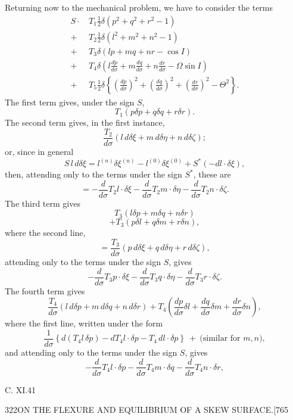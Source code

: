 \documentclass[11pt]{article}
\begin{document}
Returning now to the mechanical problem, we have to consider the terms
\begin{align*}
S\cdot\,& T_1\tfrac{1}{2}\delta(p^2 + q^2 + r^2 - 1) \\
+\,& T_2\tfrac{1}{2}\delta(l^2 + m^2 + n^2 - 1) \\
+\,& T_3\delta(lp + mq + nr - \cos I) \\
+\,& T_4\delta\left(l\frac{dp}{d\sigma} + m\frac{dq}{d\sigma} + n\frac{dr}{d\sigma} - \Omega\sin I\right) \\
+\,& T_5\tfrac{1}{2}\delta\left\{\left(\frac{dp}{d\sigma}\right)^2 + \left(\frac{dq}{d\sigma}\right)^2 + \left(\frac{dr}{d\sigma}\right)^2 - \Theta^2\right\}.
\end{align*}
The first term gives, under the sign $S$,
\[
T_1(p\delta p + q\delta q + r\delta r). \tag{*}
\]
The second term gives, in the first instance,
\[
\frac{T_2}{d\sigma}(l\,d\delta\xi + m\,d\delta\eta + n\,d\delta\zeta);
\]
or, since in general
\[
S\,l\,d\delta\xi = l^{(n)}\delta\xi^{(n)} - l^{(0)}\delta\xi^{(0)} + S^*(-dl\cdot\delta\xi),
\]
then, attending only to the terms under the sign $S^*$, these are
\[
= -\frac{d}{d\sigma}T_2 l\cdot\delta\xi - \frac{d}{d\sigma}T_2 m\cdot\delta\eta - \frac{d}{d\sigma}T_2 n\cdot\delta\zeta. \tag{*}
\]
The third term gives
\[
T_3(l\delta p + m\delta q + n\delta r) \tag{*}
\]
\[
+ T_3(p\delta l + q\delta m + r\delta n),
\]
where the second line,
\[
= \frac{T_3}{d\sigma}(p\,d\delta\xi + q\,d\delta\eta + r\,d\delta\zeta),
\]
attending only to the terms under the sign $S$, gives
\[
-\frac{d}{d\sigma}T_3 p\cdot\delta\xi - \frac{d}{d\sigma}T_3 q\cdot\delta\eta - \frac{d}{d\sigma}T_3 r\cdot\delta\zeta. \tag{*}
\]
The fourth term gives
\[
\frac{T_4}{d\sigma}\left(l\,d\delta p + m\,d\delta q + n\,d\delta r\right) + T_4\left(\frac{dp}{d\sigma}\delta l + \frac{dq}{d\sigma}\delta m + \frac{dr}{d\sigma}\delta n\right),
\]
where the first line, written under the form
\[
\frac{1}{d\sigma}\left\{d(T_4 l\,\delta p) - dT_4 l\cdot\delta p - T_4\,dl\cdot\delta p\right\}\ +\ \text{(similar for }m, n),
\]
and attending only to the terms under the sign $S$, gives
\[
-\frac{d}{d\sigma}T_4 l\cdot\delta p - \frac{d}{d\sigma}T_4 m\cdot\delta q - \frac{d}{d\sigma}T_4 n\cdot\delta r,
\]
\begin{center}{\small C. XI.\hfill 41}\end{center}

\begin{center}
{\small 322\hfill ON THE FLEXURE AND EQUILIBRIUM OF A SKEW SURFACE.\hfill [765}
\end{center}
\end{document}
